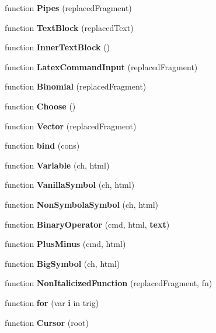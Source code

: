 \begin{DoxyCompactItemize}
function {\bf Pipes} (replaced\-Fragment)
\item 
function {\bf Text\-Block} (replaced\-Text)
\item 
function {\bf Inner\-Text\-Block} ()
\item 
function {\bf Latex\-Command\-Input} (replaced\-Fragment)
\item 
function {\bf Binomial} (replaced\-Fragment)
\item 
function {\bf Choose} ()
\item 
function {\bf Vector} (replaced\-Fragment)
\item 
function {\bf bind} (cons)
\item 
function {\bf Variable} (ch, html)
\item 
function {\bf Vanilla\-Symbol} (ch, html)
\item 
function {\bf Non\-Symbola\-Symbol} (ch, html)
\item 
function {\bf Binary\-Operator} (cmd, html, {\bf text})
\item 
function {\bf Plus\-Minus} (cmd, html)
\item 
function {\bf Big\-Symbol} (ch, html)
\item 
function {\bf Non\-Italicized\-Function} (replaced\-Fragment, fn)
\item 
function {\bf for} (var {\bf i} in trig)
\item 
function {\bf Cursor} (root)
\end{DoxyCompactItemize}
